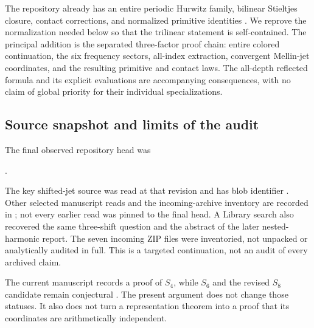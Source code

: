 The repository already has an entire periodic Hurwitz family, bilinear
Stieltjes closure, contact corrections, and normalized primitive identities
\cite{tsc:repo,tsc:shj}. We reprove the normalization needed below so that
the trilinear statement is self-contained. The principal addition is the
separated three-factor proof chain: entire colored continuation, the six
frequency sectors, all-index extraction, convergent Mellin-jet coordinates,
and the resulting primitive and contact laws. The all-depth reflected
formula and its explicit evaluations are accompanying consequences, with
no claim of global priority for their individual specializations.

\subsection{Source snapshot and limits of the audit}
The final observed repository head was
\begin{center}\pin.\end{center}
The key shifted-jet source was read at that revision and has blob identifier
.
Other selected manuscript reads and the incoming-archive inventory are
recorded in ; not every earlier read was
pinned to the final head. A Library search also recovered the same
three-shift question and the abstract of the later nested-harmonic report.
The seven incoming ZIP files were inventoried, not unpacked or analytically
audited in full. This is a targeted continuation, not an audit of every
archived claim.

The current manuscript records a proof of $S_4$, while $S_6$ and the revised
$S_8$ candidate remain conjectural \cite{tsc:repo}. The present argument does
not change those statuses. It also does not turn a representation theorem
into a proof that its coordinates are arithmetically independent.
